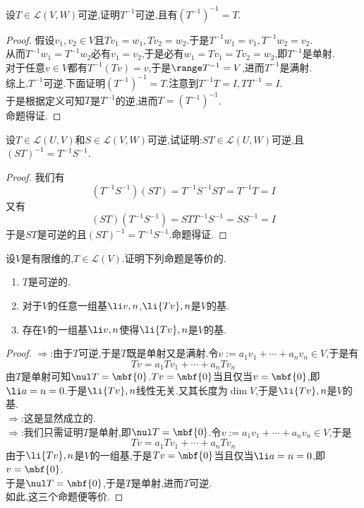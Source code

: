 \documentclass{ctexart}
\begin{document}
\pagestyle{empty}
\begin{problem}[1.]
    设$T\in\mathcal{L}(V,W)$可逆,证明$T^{-1}$可逆,且有$\left(T^{-1}\right)^{-1}=T$.
\end{problem}
\begin{proof}
    假设$v_1,v_2\in V$且$Tv_1=w_1,Tv_2=w_2$.于是$T^{-1}w_1=v_1,T^{-1}w_2=v_2$.\\
    从而$T^{-1}w_1=T^{-1}w_2$必有$v_1=v_2$,于是必有$w_1=Tv_1=Tv_2=w_2$,即$T^{-1}$是单射.\\
    对于任意$v\in V$都有$T^{-1}(Tv)=v$,于是$\range T^{-1}=V$,进而$T^{-1}$是满射.\\
    综上,$T^{-1}$可逆.下面证明$\left(T^{-1}\right)^{-1}=T$.注意到$T^{-1}T=I,TT^{-1}=I$.\\
    于是根据定义可知$T$是$T^{-1}$的逆,进而$T=\left(T^{-1}\right)^{-1}$.\\
    命题得证.
\end{proof}
\begin{problem}[2.]
    设$T\in\mathcal{L}(U,V)$和$S\in\mathcal{L}(V,W)$可逆,试证明:$ST\in\mathcal{L}(U,W)$可逆,且$(ST)^{-1}=T^{-1}S^{-1}$.
\end{problem}
\begin{proof}
    我们有$$(T^{-1}S^{-1})(ST)=T^{-1}S^{-1}ST=T^{-1}T=I$$
    又有$$(ST)(T^{-1}S^{-1})=STT^{-1}S^{-1}=SS^{-1}=I$$
    于是$ST$是可逆的且$(ST)^{-1}=T^{-1}S^{-1}$.命题得证.
\end{proof}
\begin{problem}[3.]
    设$V$是有限维的,$T\in\mathcal{L}(V)$.证明下列命题是等价的.
    \begin{enumerate}[label=\tbf{(\arabic*)}]
        \item $T$是可逆的.
        \item 对于$V$的任意一组基$\li v,n$,$\li {Tv},n$是$V$的基.
        \item 存在$V$的一组基$\li v,n$使得$\li {Tv},n$是$V$的基.
    \end{enumerate}
\end{problem}
\begin{proof}
    $\Rightarrow$:由于$T$可逆,于是$T$既是单射又是满射.令$v:=a_1v_1+\cdots+a_nv_n\in V$,于是有
    $$Tv=a_1Tv_1+\cdots+a_nTv_n$$
    由$T$是单射可知$\nul T=\mbf{0}$.$Tv=\mbf{0}$当且仅当$v=\mbf{0}$,即$\li a=n=0$.于是$\li {Tv},n$线性无关.又其长度为$\dim V$,于是$\li {Tv},n$是$V$的基.\\
    $\Rightarrow$:这是显然成立的.\\
    $\Rightarrow$:我们只需证明$T$是单射,即$\nul T=\mbf{0}$.令$v:=a_1v_1+\cdots+a_nv_n\in V$,于是
    $$Tv=a_1Tv_1+\cdots+a_nTv_n$$
    由于$\li {Tv},n$是$V$的一组基,于是$Tv=\mbf{0}$当且仅当$\li a=n=0$,即$v=\mbf{0}$.\\
    于是$\nul T=\mbf{0}$,于是$T$是单射,进而$T$可逆.\\
    如此,这三个命题便等价.
\end{proof}
\end{document}
